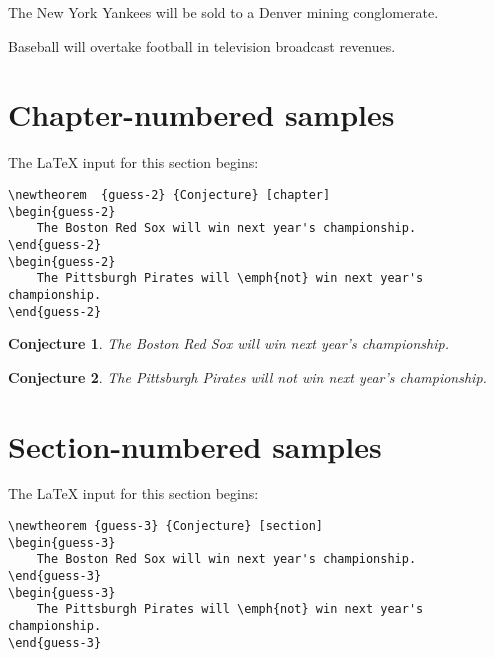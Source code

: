 \begin{prediction}
    The New York Yankees will be sold to a Denver mining conglomerate.
\end{prediction}

\begin{prediction}
    Baseball will overtake football in television broadcast revenues.
\end{prediction}


\section{Chapter-numbered samples}

The \LaTeX{} input for this section begins:
%
\begin{verbatim}
\newtheorem  {guess-2} {Conjecture} [chapter]
\begin{guess-2}
    The Boston Red Sox will win next year's championship.
\end{guess-2}
\begin{guess-2}
    The Pittsburgh Pirates will \emph{not} win next year's championship.
\end{guess-2}
\end{verbatim}

%
\newtheorem {guess-2} {Conjecture} [chapter]

\begin{guess-2}
    The Boston Red Sox will win next year's championship.
\end{guess-2}

\begin{guess-2}
    The Pittsburgh Pirates will \emph{not} win next year's championship.
\end{guess-2}


\section{Section-numbered samples}

The \LaTeX{} input for this section begins:
%
\begin{verbatim}
\newtheorem {guess-3} {Conjecture} [section]
\begin{guess-3}
    The Boston Red Sox will win next year's championship.
\end{guess-3}
\begin{guess-3}
    The Pittsburgh Pirates will \emph{not} win next year's championship.
\end{guess-3}
\end{verbatim}

